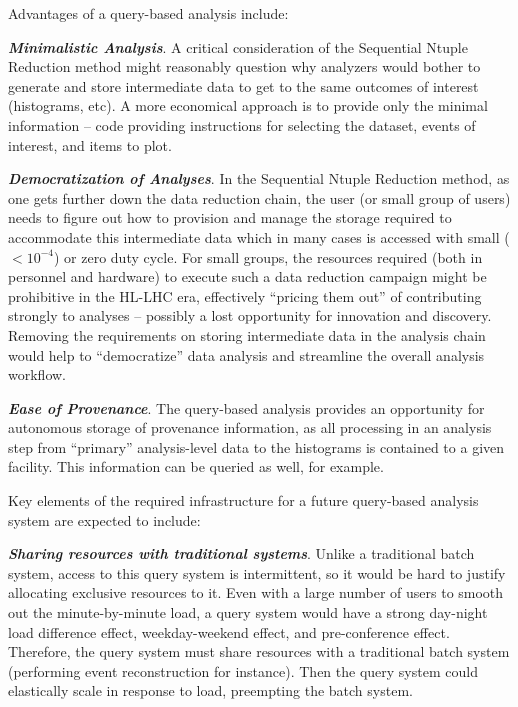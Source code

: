 \documentclass[12pt,a4paper]{article}
\begin{document}
\vskip 0.1in\noindent
Advantages of a query-based analysis include:

\vskip 0.1in\noindent
\textbf{\textit{Minimalistic Analysis}}.
A critical consideration of the Sequential Ntuple Reduction method might reasonably question why analyzers would bother to generate and store intermediate data to get to the same outcomes of interest (histograms, etc). A more economical approach is to provide only the minimal information -- code providing instructions for selecting the dataset, events of interest, and items to plot. 

\vskip 0.1in\noindent
\textbf{\textit{Democratization of Analyses}}.
In the Sequential Ntuple Reduction method, as one gets further down the data reduction chain, the user (or small group of users) needs to figure out how to provision and manage the storage required to accommodate this intermediate data which in many cases is accessed with small ($<10^{-4}$) or zero duty cycle. For small groups, the resources required (both in personnel and hardware) to execute such a data reduction campaign might be prohibitive in the HL-LHC era, effectively ``pricing them out'' of contributing strongly to analyses -- possibly a lost opportunity for innovation and discovery. Removing the requirements on storing intermediate data in the analysis chain would help to ``democratize'' data analysis and streamline the overall analysis workflow.

\vskip 0.1in\noindent
\textbf{\textit{Ease of Provenance}}.
The query-based analysis provides an opportunity for autonomous storage of provenance information, as all processing in an analysis step from ``primary'' analysis-level data to the histograms is contained to a given facility. This information can be queried as well, for example.

\vskip 0.1in\noindent
Key elements of the required infrastructure for a future query-based analysis system are expected to include:

\vskip 0.1in\noindent
\textbf{\textit{Sharing resources with traditional systems}}. Unlike a traditional batch system, access to this query system is intermittent, so it would be hard to justify allocating exclusive resources to it. Even with a large number of users to smooth out the minute-by-minute load, a query system would have a strong day-night load difference effect, weekday-weekend effect, and pre-conference effect. Therefore, the query system must share resources with a traditional batch system (performing event reconstruction for instance). Then the query system could elastically scale in response to load, preempting the batch system.
\end{document}
